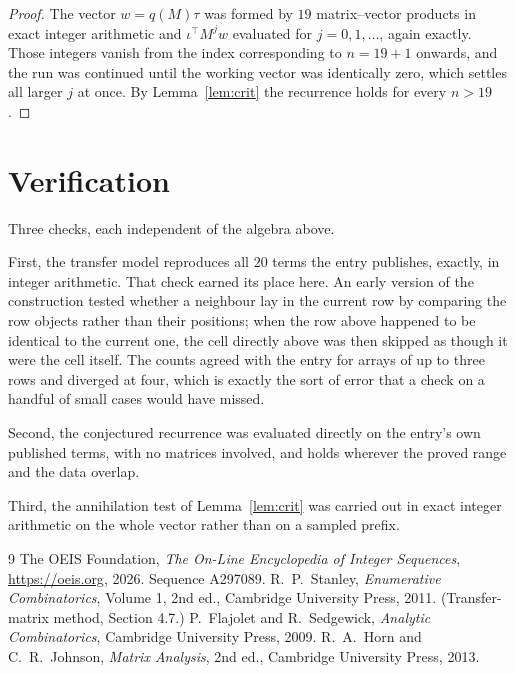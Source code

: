 \documentclass[11pt,a4paper]{article}
\theoremstyle{plain}
\theoremstyle{definition}
\begin{document}
\begin{proof}
The vector $w=q(M)\tau$ was formed by $19$ matrix--vector products in exact integer
arithmetic and $\iota^{\!\top}M^{j}w$ evaluated for $j=0,1,\dots$, again exactly. Those
integers vanish from the index corresponding to $n=19+1$ onwards, and the run was
continued until the working vector was identically zero, which settles all larger $j$ at once.
By Lemma~\ref{lem:crit} the recurrence holds for every $n>19$.
\end{proof}

\section{Verification}

Three checks, each independent of the algebra above.

First, the transfer model reproduces all $20$ terms the entry publishes, exactly, in
integer arithmetic. That check earned its place here. An early version of the construction
tested whether a neighbour lay in the current row by comparing the row objects rather
than their positions; when the row above happened to be identical to the current one, the
cell directly above was then skipped as though it were the cell itself. The counts agreed with
the entry for arrays of up to three rows and diverged at four, which is exactly the sort of
error that a check on a handful of small cases would have missed.

Second, the conjectured recurrence was evaluated directly on the entry's own published terms,
with no matrices involved, and holds wherever the proved range and the data overlap.

Third, the annihilation test of Lemma~\ref{lem:crit} was carried out in exact integer
arithmetic on the whole vector rather than on a sampled prefix.

\begin{thebibliography}{9}
 The OEIS Foundation, \emph{The On-Line Encyclopedia of Integer
Sequences}, \url{https://oeis.org}, 2026. Sequence A297089.
 R.~P.~Stanley, \emph{Enumerative Combinatorics}, Volume 1, 2nd ed.,
Cambridge University Press, 2011. (Transfer-matrix method, Section 4.7.)
 P.~Flajolet and R.~Sedgewick, \emph{Analytic Combinatorics}, Cambridge
University Press, 2009.
 R.~A.~Horn and C.~R.~Johnson, \emph{Matrix Analysis}, 2nd ed., Cambridge
University Press, 2013.
\end{thebibliography}
\end{document}
